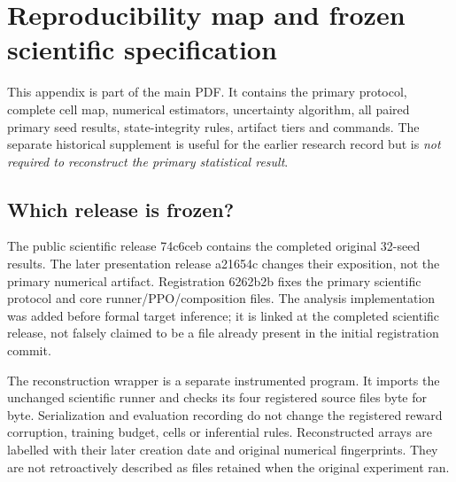 \clearpage
\appendix
\section{Reproducibility map and frozen scientific specification}\label{app:repro}
This appendix is part of the main PDF. It contains the primary protocol, complete cell map, numerical estimators, uncertainty algorithm, all paired primary seed results, state-integrity rules, artifact tiers and commands. The separate historical supplement is useful for the earlier research record but is \emph{not required to reconstruct the primary statistical result}.

\subsection{Which release is frozen?}
The public scientific release 74c6ceb contains the completed original 32-seed results. The later presentation release a21654c changes their exposition, not the primary numerical artifact. Registration 6262b2b fixes the primary scientific protocol and core runner/PPO/composition files. The analysis implementation was added before formal target inference; it is linked at the completed scientific release, not falsely claimed to be a file already present in the initial registration commit.

The reconstruction wrapper is a separate instrumented program. It imports the unchanged scientific runner and checks its four registered source files byte for byte. Serialization and evaluation recording do not change the registered reward corruption, training budget, cells or inferential rules. Reconstructed arrays are labelled with their later creation date and original numerical fingerprints. They are not retroactively described as files retained when the original experiment ran.


